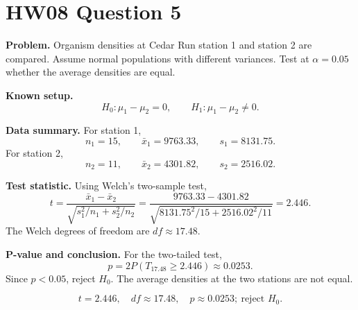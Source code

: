 \documentclass[11pt]{article}
\begin{document}
\section*{HW08 Question 5}

\textbf{Problem.} Organism densities at Cedar Run station 1 and station 2 are compared. Assume normal populations with different variances. Test at \(\alpha=0.05\) whether the average densities are equal.

\textbf{Known setup.}
\[
H_0:\mu_1-\mu_2=0,\qquad H_1:\mu_1-\mu_2\ne0.
\]

\textbf{Data summary.} For station 1,
\[
n_1=15,\qquad \bar{x}_1=9763.33,\qquad s_1=8131.75.
\]
For station 2,
\[
n_2=11,\qquad \bar{x}_2=4301.82,\qquad s_2=2516.02.
\]

\textbf{Test statistic.} Using Welch's two-sample test,
\[
t=\frac{\bar{x}_1-\bar{x}_2}{\sqrt{s_1^2/n_1+s_2^2/n_2}}
  =\frac{9763.33-4301.82}{\sqrt{8131.75^2/15+2516.02^2/11}}
  =2.446.
\]
The Welch degrees of freedom are \(df\approx17.48\).

\textbf{P-value and conclusion.} For the two-tailed test,
\[
p=2P(T_{17.48}\ge 2.446)\approx0.0253.
\]
Since \(p<0.05\), reject \(H_0\). The average densities at the two stations are not equal.

\[
\boxed{t=2.446,\quad df\approx17.48,\quad p\approx0.0253;\ \text{reject }H_0.}
\]
\end{document}
